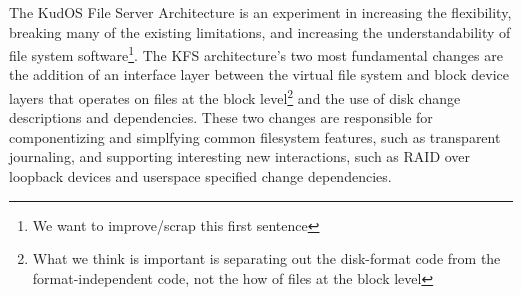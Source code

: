 The KudOS File Server Architecture is an experiment in increasing the
flexibility, breaking many of the existing limitations, and increasing
the understandability of file system software\footnote{We want to
  improve/scrap this first sentence}.  The KFS architecture's two most
fundamental changes are the addition of an interface layer between the
virtual file system and block device layers that operates on files at
the block level\footnote{What we think is important is separating out the disk-format code from the format-independent code, not the how of files at the block level} and the use of disk change descriptions and
dependencies. These two changes are responsible for componentizing and
simplfying common filesystem features, such as transparent journaling,
and supporting interesting new interactions, such as RAID over
loopback devices and userspace specified change dependencies.
